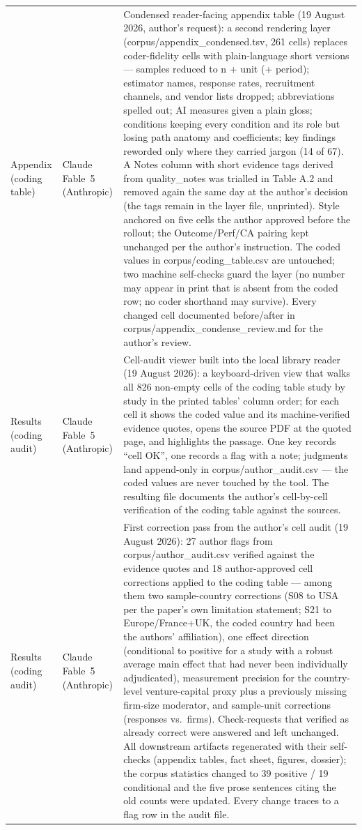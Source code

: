 \begin{longtable}{@{}p{2.9cm}p{3.2cm}p{9.0cm}@{}}
\addlinespace
Appendix (coding table) & Claude Fable~5 (Anthropic) & Condensed reader-facing appendix table (19 August 2026, author's request): a second rendering layer (corpus/appendix\_condensed.tsv, 261 cells) replaces coder-fidelity cells with plain-language short versions --- samples reduced to n + unit (+ period); estimator names, response rates, recruitment channels, and vendor lists dropped; abbreviations spelled out; AI measures given a plain gloss; conditions keeping every condition and its role but losing path anatomy and coefficients; key findings reworded only where they carried jargon (14 of 67). A Notes column with short evidence tags derived from quality\_notes was trialled in Table A.2 and removed again the same day at the author's decision (the tags remain in the layer file, unprinted). Style anchored on five cells the author approved before the rollout; the Outcome/Perf/CA pairing kept unchanged per the author's instruction. The coded values in corpus/coding\_table.csv are untouched; two machine self-checks guard the layer (no number may appear in print that is absent from the coded row; no coder shorthand may survive). Every changed cell documented before/after in corpus/appendix\_condense\_review.md for the author's review. \\
\addlinespace
Results (coding audit) & Claude Fable~5 (Anthropic) & Cell-audit viewer built into the local library reader (19 August 2026): a keyboard-driven view that walks all 826 non-empty cells of the coding table study by study in the printed tables' column order; for each cell it shows the coded value and its machine-verified evidence quotes, opens the source PDF at the quoted page, and highlights the passage. One key records ``cell OK'', one records a flag with a note; judgments land append-only in corpus/author\_audit.csv --- the coded values are never touched by the tool. The resulting file documents the author's cell-by-cell verification of the coding table against the sources. \\
\addlinespace
Results (coding audit) & Claude Fable~5 (Anthropic) & First correction pass from the author's cell audit (19 August 2026): 27 author flags from corpus/author\_audit.csv verified against the evidence quotes and 18 author-approved cell corrections applied to the coding table --- among them two sample-country corrections (S08 to USA per the paper's own limitation statement; S21 to Europe/France+UK, the coded country had been the authors' affiliation), one effect direction (conditional to positive for a study with a robust average main effect that had never been individually adjudicated), measurement precision for the country-level venture-capital proxy plus a previously missing firm-size moderator, and sample-unit corrections (responses vs.\ firms). Check-requests that verified as already correct were answered and left unchanged. All downstream artifacts regenerated with their self-checks (appendix tables, fact sheet, figures, dossier); the corpus statistics changed to 39 positive / 19 conditional and the five prose sentences citing the old counts were updated. Every change traces to a flag row in the audit file. \\

\end{longtable}
